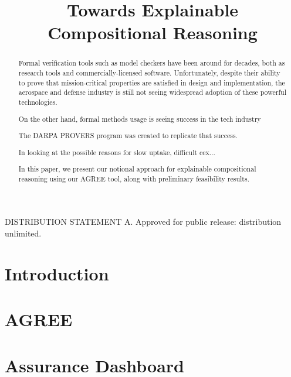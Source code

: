 \documentclass[conference]{IEEEtran}
\begin{document}
\title{Towards Explainable Compositional Reasoning}



\maketitle

\begin{abstract}

Formal verification tools such as model checkers have been around for decades, both as research tools and commercially-licensed software.  Unfortunately, despite their ability to prove that mission-critical properties are satisfied in design and implementation, the aerospace and defense industry is still not seeing widespread adoption of these powerful technologies. 

On the other hand, formal methods usage is seeing success in the tech industry

The DARPA PROVERS program was created to replicate that success.

In looking at the possible reasons for slow uptake, difficult cex...

In this paper, we present our notional approach for explainable compositional reasoning using our AGREE tool, along with preliminary feasibility results.
	

\end{abstract}

DISTRIBUTION STATEMENT A. Approved for public release: distribution unlimited.

\section{Introduction}
\label{sec:introduction}


\section{AGREE}
\label{sec:agree}


\section{Assurance Dashboard}
\label{sec:dashboard}

\end{document}
